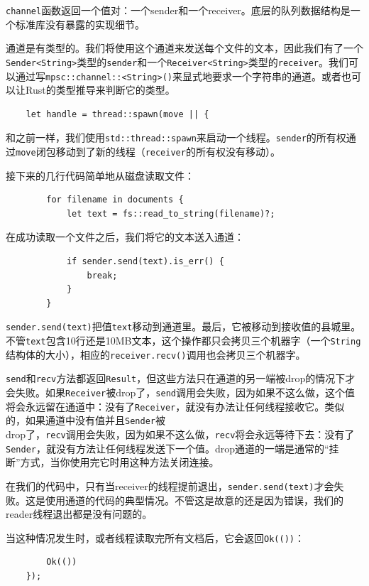 \texttt{channel}函数返回一个值对：一个sender和一个receiver。底层的队列数据结构是一个标准库没有暴露的实现细节。

通道是有类型的。我们将使用这个通道来发送每个文件的文本，因此我们有了一个\texttt{Sender<String>}类型的\texttt{sender}和一个\texttt{Receiver<String>}类型的\texttt{receiver}。我们可以通过写\texttt{mpsc::channel::<String>()}来显式地要求一个字符串的通道。或者也可以让Rust的类型推导来判断它的类型。

\begin{verbatim}
    let handle = thread::spawn(move || {
\end{verbatim}
和之前一样，我们使用\texttt{std::thread::spawn}来启动一个线程。\texttt{sender}的所有权通过\texttt{move}闭包移动到了新的线程（\texttt{receiver}的所有权没有移动）。

接下来的几行代码简单地从磁盘读取文件：
\begin{verbatim}
        for filename in documents {
            let text = fs::read_to_string(filename)?;
\end{verbatim}

在成功读取一个文件之后，我们将它的文本送入通道：
\begin{verbatim}
            if sender.send(text).is_err() {
                break;
            }
        }
\end{verbatim}

\texttt{sender.send(text)}把值\texttt{text}移动到通道里。最后，它被移动到接收值的县城里。不管\texttt{text}包含10行还是10MB文本，这个操作都只会拷贝三个机器字（一个\texttt{String}结构体的大小），相应的\texttt{receiver.recv()}调用也会拷贝三个机器字。

\texttt{send}和\texttt{recv}方法都返回\texttt{Result}，但这些方法只在通道的另一端被drop的情况下才会失败。如果\texttt{Receiver}被drop了，\texttt{send}调用会失败，因为如果不这么做，这个值将会永远留在通道中：没有了\texttt{Receiver}，就没有办法让任何线程接收它。类似的，如果通道中没有值并且\texttt{Sender}被\\
drop了，\texttt{recv}调用会失败，因为如果不这么做，\texttt{recv}将会永远等待下去：没有了\texttt{Sender}，就没有方法让任何线程发送下一个值。drop通道的一端是通常的“挂断”方式，当你使用完它时用这种方法关闭连接。

在我们的代码中，只有当receiver的线程提前退出，\texttt{sender.send(text)}才会失败。这是使用通道的代码的典型情况。不管这是故意的还是因为错误，我们的reader线程退出都是没有问题的。

当这种情况发生时，或者线程读取完所有文档后，它会返回\texttt{Ok(())}：
\begin{verbatim}
        Ok(())
    });
\end{verbatim}

